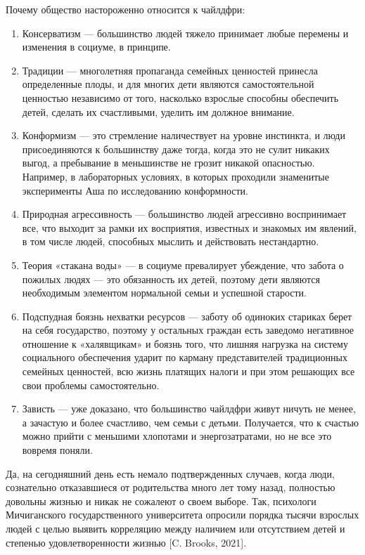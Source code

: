 Почему общество настороженно относится к чайлдфри:
\begin{enumerate}
    \item Консерватизм --- большинство людей тяжело принимает любые перемены и изменения в социуме, в принципе.
    \item Традиции --- многолетняя пропаганда семейных ценностей принесла определенные плоды, и для многих дети являются самостоятельной ценностью независимо от того, насколько взрослые способны обеспечить детей, сделать их счастливыми, уделить им должное внимание.
    \item Конформизм --- это стремление наличествует на уровне инстинкта, и люди присоединяются к большинству даже тогда, когда это не сулит никаких выгод, а пребывание в меньшинстве не грозит никакой опасностью. Например, в лабораторных условиях, в которых проходили знаменитые эксперименты Аша по исследованию конформности.
    \item Природная агрессивность --- большинство людей агрессивно воспринимает все, что выходит за рамки их восприятия, известных и знакомых им явлений, в том числе людей, способных мыслить и действовать нестандартно.
    \item Теория «стакана воды» --- в социуме превалирует убеждение, что забота о пожилых людях --- это обязанность их детей, поэтому дети являются необходимым элементом нормальной семьи и успешной старости.
    \item Подспудная боязнь нехватки ресурсов --- заботу об одиноких стариках берет на себя государство, поэтому у остальных граждан есть заведомо негативное отношение к «халявщикам» и боязнь того, что лишняя нагрузка на систему социального обеспечения ударит по карману представителей традиционных семейных ценностей, всю жизнь платящих налоги и при этом решающих все свои проблемы самостоятельно.
    \item Зависть --- уже доказано, что большинство чайлдфри живут ничуть не менее, а зачастую и более счастливо, чем семьи с детьми. Получается, что к счастью можно прийти с меньшими хлопотами и энергозатратами, но не все это вовремя поняли.
\end{enumerate}

Да, на сегодняшний день есть немало подтвержденных случаев, когда люди, сознательно отказавшиеся от родительства много лет тому назад, полностью довольны жизнью и никак не сожалеют о своем выборе. Так, психологи Мичиганского государственного университета опросили порядка тысячи взрослых людей с целью выявить корреляцию между наличием или отсутствием детей и степенью удовлетворенности жизнью [C. Brooks, 2021].

